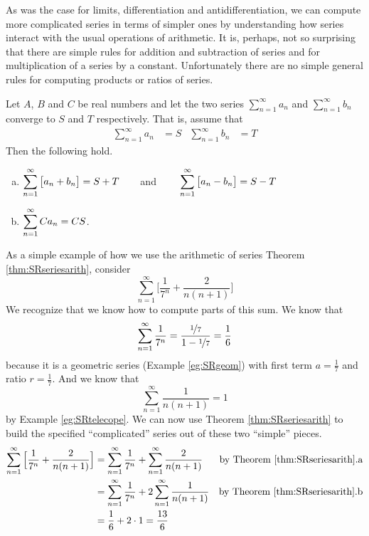 As was the case for limits, differentiation and antidifferentiation,
we can compute more complicated series in
terms of simpler ones by understanding how series interact
with the usual operations of arithmetic. It is, perhaps,
not so surprising that there are simple rules for addition and subtraction
of series and for multiplication of a series by a constant. Unfortunately
there are no simple general rules for computing products or ratios of series.
\begin{theorem}\label{thm:SRseriesarith}
  Let $A$, $B$ and $C$ be real numbers and let the two series
$\sum_{n=1}^\infty a_n$ and  $\sum_{n=1}^\infty b_n$
converge to $S$ and $T$ respectively. That is, assume that
 \begin{align*}
  \sum_{n=1}^\infty a_n&=S & \sum_{n=1}^\infty b_n &=T
\end{align*}
  Then the following hold.
\begin{enumerate}[(a)]
 \item $\displaystyle \sum_{n=1}^\infty \big[a_n+b_n\big] = S+T\qquad$and
 $\qquad\displaystyle \sum_{n=1}^\infty \big[a_n-b_n\big] = S-T$
      \\
\item $\displaystyle \sum_{n=1}^\infty C a_n = C S$.
\end{enumerate}
\end{theorem}

\begin{eg}\label{eg:SRseriesarith}
As a simple example of how we use the arithmetic of series Theorem
\ref{thm:SRseriesarith}, consider
\begin{equation*}
\sum_{n=1}^\infty\Big[\frac{1}{7^n}+\frac{2}{n(n+1)}\Big]
\end{equation*}
We recognize that we know how to compute parts of this sum.
We know that
\begin{equation*}
\sum_{n=1}^\infty\frac{1}{7^n}=\frac{\nicefrac{1}{7}}{1-\nicefrac{1}{7}}
=\frac{1}{6}
\end{equation*}
because it is a geometric series (Example \ref{eg:SRgeom}) with
first term $a=\frac{1}{7}$ and ratio $r=\frac{1}{7}$. And we
know that
\begin{equation*}
\sum_{n=1}^\infty\frac{1}{n(n+1)} =1
\end{equation*}
by Example \ref{eg:SRtelecope}. We can now use Theorem
\ref{thm:SRseriesarith} to build the specified ``complicated''
series out of these two ``simple'' pieces.
\begin{align*}
\sum_{n=1}^\infty\Big[\frac{1}{7^n}+\frac{2}{n(n+1)}\Big]
&=\sum_{n=1}^\infty \frac{1}{7^n}
   +\sum_{n=1}^\infty\frac{2}{n(n+1)}
 & \text{by Theorem \ref{thm:SRseriesarith}.a} \\
&= \sum_{n=1}^\infty\frac{1}{7^n}
  +2 \sum_{n=1}^\infty \frac{1}{n(n+1)}
 & \text{by Theorem \ref{thm:SRseriesarith}.b} \\
&=\frac{1}{6}+2\cdot 1 =\frac{13}{6}
\end{align*}
\end{eg}


